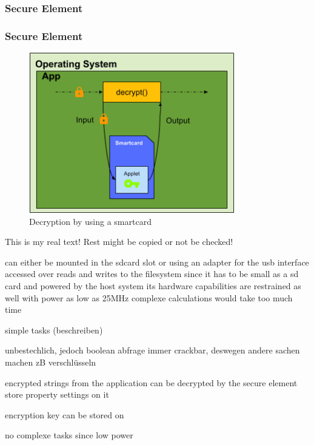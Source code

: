 \subsubsection{Secure Element} \label{subsection:counter-replace-encryption-key-local}
\subsubsection{Secure Element} \label{subsection:counter-replace-encryption-key-online}
\begin{figure}[h]
    \centering
    \includegraphics[width=0.8\textwidth]{data/encryptionKeySmart.png}
    \caption{Decryption by using a smartcard}
    \label{fig:encryptionKeySmart}
\end{figure}

This is my real text! Rest might be copied or not be checked!

can either be mounted in the sdcard slot or using an adapter for the usb interface
accessed over reads and writes to the filesystem
since it has to be small as a sd card and powered by the host system its hardware capabilities are restrained as well \cite{stSe} with power as low as 25MHz complexe calculations would take too much time

simple tasks (beschreiben)

unbestechlich, jedoch boolean abfrage immer crackbar, deswegen andere sachen machen zB verschlüsseln

encrypted strings from the application can be decrypted by the secure element
store property settings on it

encryption key can be stored on

no complexe tasks since low power


